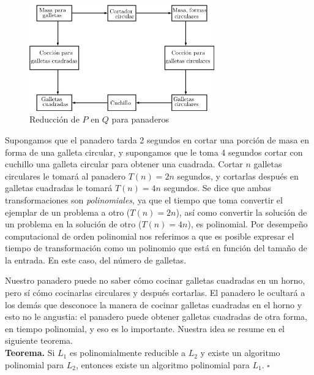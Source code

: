 \documentclass[11 pt, a4paper]{article}
\theoremstyle{definition}
\begin{document}
\begin{enumerate}
            \begin{figure}[h]
                \includegraphics[width=80mm]{Reduc_P_en_Q_Pan.png}
                \centering
                \caption{Reducci\'on de $P$ en $Q$ para panaderos}
                \label{fig:PQ_Red_Pan}
            \end{figure}

            Supongamos que el panadero tarda 2 segundos en cortar una porción de masa en forma de una galleta circular,
            y supongamos que le toma 4 segundos cortar con cuchillo una galleta circular para obtener una cuadrada.
            Cortar $n$ galletas circulares le tomar\'a al panadero $T(n) = 2n$ segundos, y cortarlas despu\'es en galletas
            cuadradas le tomar\'a $T(n) = 4n$ segundos. Se dice que ambas transformaciones son \emph{polinomiales}, ya
            que el tiempo que toma convertir el ejemplar de un problema a otro ($T(n) = 2n$), as\'i como convertir la soluci\'on de un problema en la soluci\'on de otro ($T(n) = 4n$), es polinomial. Por desempe\~no computacional de orden polinomial nos referimos a que es posible expresar el tiempo de transformaci\'on como un polinomio que est\'a en funci\'on del tama\~no de la entrada. En este caso, del n\'umero de galletas. \par

            Nuestro panadero puede no saber c\'omo cocinar galletas cuadradas en un horno, pero s\'i c\'omo cocinarlas
            circulares y despu\'es cortarlas. El panadero le ocultar\'a a los dem\'as que desconoce la manera de cocinar galletas cuadradas en el horno y esto no le angustia: el panadero puede obtener galletas cuadradas de otra forma, en tiempo polinomial, y eso es lo importante. Nuestra idea se resume en el siguiente teorema.\\
            \textbf{Teorema.} Si $L_1$ es polinomialmente reducible a $L_2$ y existe un algoritmo polinomial para $L_2$, entonces existe un algoritmo polinomial para $L_1$. $\square$ \\


\end{enumerate}
\end{document}
